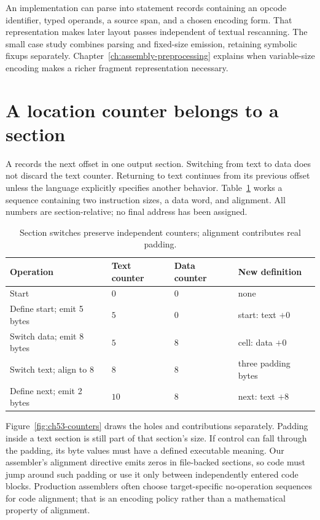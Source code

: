 An implementation can parse into statement records containing an opcode identifier, typed operands, a source span, and a chosen encoding form.
That representation makes later layout passes independent of textual rescanning.
The small case study combines parsing and fixed-size emission, retaining symbolic fixups separately.
Chapter~\ref{ch:assembly-preprocessing} explains when variable-size encoding makes a richer fragment representation necessary.

\section{A location counter belongs to a section}
\label{sec:ch53-counters}

A  records the next offset in one output section.
Switching from text to data does not discard the text counter.
Returning to text continues from its previous offset unless the language explicitly specifies another behavior.
Table~\ref{tab:ch53-counters} works a sequence containing two instruction sizes, a data word, and alignment.
All numbers are section-relative; no final address has been assigned.

\begin{table}[htbp]
\caption{Section switches preserve independent counters; alignment contributes real padding.}
\label{tab:ch53-counters}
\centering
\begin{tabular}{llll}
\toprule
Operation & Text counter & Data counter & New definition \\
\midrule
Start & $0$ & $0$ & none \\
Define start; emit 5 bytes & $5$ & $0$ & start: text $+0$ \\
Switch data; emit 8 bytes & $5$ & $8$ & cell: data $+0$ \\
Switch text; align to 8 & $8$ & $8$ & three padding bytes \\
Define next; emit 2 bytes & $10$ & $8$ & next: text $+8$ \\
\bottomrule
\end{tabular}
\end{table}

Figure~\ref{fig:ch53-counters} draws the holes and contributions separately.
Padding inside a text section is still part of that section's size.
If control can fall through the padding, its byte values must have a defined executable meaning.
Our assembler's alignment directive emits zeros in file-backed sections, so code must jump around such padding or use it only between independently entered code blocks.
Production assemblers often choose target-specific no-operation sequences for code alignment; that is an encoding policy rather than a mathematical property of alignment.

